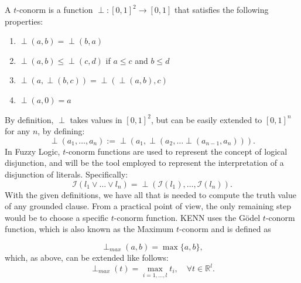 \begin{definition}[$t$-conorm ]
	A $t$-conorm is a function $\perp: \left[0,1 \right]^2 \rightarrow \left[0,1 \right]$ that satisfies the following properties:
	\begin{enumerate}
		\item $\perp(a, b)=\perp(b, a)$
		\item $\perp(a, b) \leq \perp(c, d)$ if $a \leq c$ and $b \leq d$
		\item $\perp(a, \perp(b, c))=\perp(\perp(a, b), c)$
		\item $\perp(a, 0)=a$
	\end{enumerate}
\end{definition}
By definition, $\perp$ takes values in $\left[0,1 \right]^2$, but can be easily extended to $\left[0,1 \right]^n$ for any $n$, by defining:
\begin{equation*}
\perp(a_1,\dots,a_n) := \perp(a_1,\perp(a_2,\dots \perp(a_{n-1},a_n))).
\end{equation*}
In Fuzzy Logic, $t$-conorm functions are used to represent the concept of logical disjunction, and will be the tool employed to represent the interpretation of a disjunction of literals. Specifically:
\begin{equation}
\mathcal{I}(l_1 \vee \dots \vee l_n) = \perp(\mathcal{I}(l_1),\dots,\mathcal{I}(l_n)).
\end{equation}
With the given definitions, we have all that is needed to compute the truth value of any grounded clause. From a practical point of view, the only remaining step would be to choose a specific $t$-conorm function. KENN uses the Gödel $t$-conorm function, which is also known as the Maximum $t$-conorm and is defined as

\begin{equation*}
\perp_{max}(a,b) = \max\{a,b\},
\end{equation*}
which, as above, can be extended like follows:
\begin{equation*}
\perp_{max}(t) = \max_{i=1,\dots,l} t_i, \quad \forall t \in \mathbb{R}^l.
\end{equation*}

